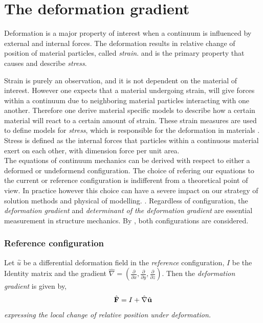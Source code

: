 \section{The deformation gradient}
Deformation is a major property of interest when a continuum is influenced by external and internal forces.  The deformation results in relative change of position of material particles, called \textit{strain}. and is the primary property that causes and describe \textit{stress}.

Strain is purely an observation, and it is not dependent on the material of interest. However one expects that a material undergoing strain, will give  forces within a continuum due to neighboring material particles interacting with one another. Therefore one derive material specific models to describe how a certain material will react to a certain amount of strain.
These strain measures are used to define models for \textit{stress}, which is responsible for the deformation in materials \cite{Holzapfel2000}. Stress is defined as the internal forces that particles within a continuous material exert on each other, with dimension force per unit area.  \\

The equations of continuum mechanics can be derived with respect to either a deformed or undeformend configuration. The choice of refering our equations to the current or reference configuration is indifferent from a theoretical point of view. In practice however this choice can have a severe impact on our strategy of solution methods and physical of modelling.   \cite{Wriggers2006}. Regardless of configuration, the \textit{deformation gradient} and \textit{determinant of the deformation gradient} are essential measurement in structure mechanics. 
By \cite{Richter2016}, both configurations are considered.


\subsubsection*{Reference configuration}
\begin{defn}
Let $\hat{u}$ be a differential deformation field in the \textit{reference} configuration, $I$ be the Identity matrix and
the gradient $\hat{\nabla} = (\frac{\partial}{\partial x}, \frac{\partial}{\partial y}, \frac{\partial}{\partial z}) $. Then the \textit{deformation gradient} is given by,
\begin{align}
\hat{\mathbf{F}} = I + \hat{\nabla} \hat{\mathbf{u}} 
\end{align} 
\textit{expressing the local change of relative position under deformation.}
\end{defn}

